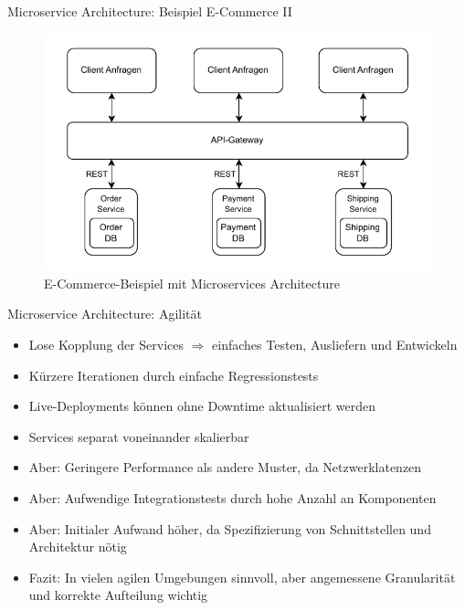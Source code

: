 \begin{frame}{Microservice Architecture: Beispiel E-Commerce II}
    \begin{figure}[!h]
        \centering
        \includegraphics[scale=0.6]{imglib/microservices/ecommerce-microservices}
        \caption{E-Commerce-Beispiel mit Microservices Architecture}
        \label{fig:microservices-ecommerce}
    \end{figure}
\end{frame}

\begin{frame}{Microservice Architecture: Agilität}
    \begin{itemize}
        \item Lose Kopplung der Services $\Rightarrow$ einfaches Testen, Ausliefern und Entwickeln
        \item Kürzere Iterationen durch einfache Regressionstests
        \item Live-Deployments können ohne Downtime aktualisiert werden
        \item Services separat voneinander skalierbar
        \item Aber: Geringere Performance als andere Muster, da Netzwerklatenzen
        \item Aber: Aufwendige Integrationstests durch hohe Anzahl an Komponenten
        \item Aber: Initialer Aufwand höher, da Spezifizierung von Schnittstellen und Architektur nötig~\cite{architecturePatterns}
        \item Fazit: In vielen agilen Umgebungen sinnvoll, aber angemessene Granularität und korrekte Aufteilung wichtig
    \end{itemize}
\end{frame}
